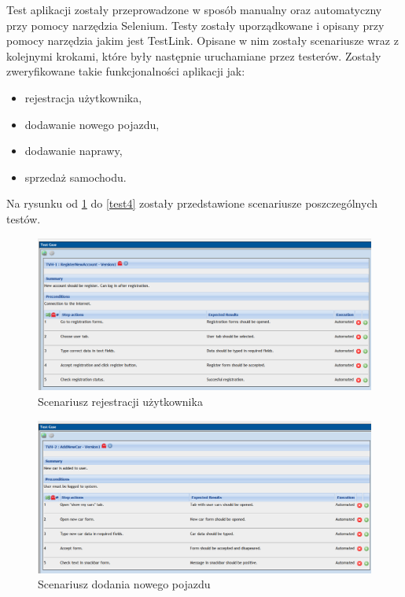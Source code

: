 \documentclass[12pt]{article}
\begin{document}
Test aplikacji zostały przeprowadzone w sposób manualny oraz automatyczny przy pomocy narzędzia Selenium. Testy zostały uporządkowane i opisany przy pomocy narzędzia jakim jest TestLink. Opisane w nim zostały scenariusze wraz z kolejnymi krokami, które były następnie uruchamiane przez testerów. Zostały zweryfikowane takie funkcjonalności aplikacji jak:
\begin{itemize}
  \item rejestracja użytkownika,
  \item dodawanie nowego pojazdu,
  \item dodawanie naprawy,
  \item sprzedaż samochodu.
\end{itemize}

Na rysunku od \ref{test1} do \ref{test4} zostały przedstawione scenariusze poszczególnych testów.

	 \begin{figure}[H]
		\centering
		\includegraphics[scale=0.61]{registerTest.png}
		\caption{Scenariusz rejestracji użytkownika}
		\label{test1}
	\end{figure}
	
	
	 \begin{figure}[H]
		\centering
		\includegraphics[scale=0.61]{addNewCarTest.png}
		\caption{Scenariusz dodania nowego pojazdu}
		\label{test2}
	\end{figure}
	
\end{document}
